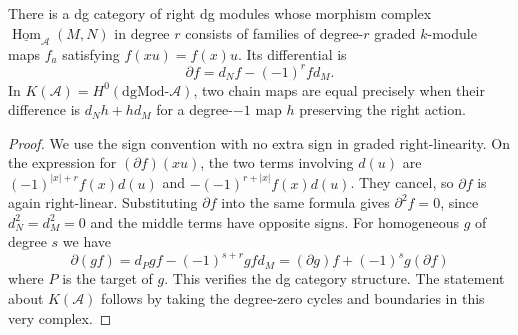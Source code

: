 \begin{proposition}\label{res:G03}
There is a dg category of right dg modules whose morphism complex
\(\underline{\operatorname{Hom}}_{\mathcal A}(M,N)\) in degree \(r\)
consists of families of degree-\(r\) graded \(k\)-module maps
\(f_a\) satisfying \(f(xu)=f(x)u\). Its differential is
\[
        \partial f=d_N f-(-1)^r f d_M .
\]
In \(K(\mathcal A)=H^0(\mathrm{dgMod}\text{-}\mathcal A)\), two chain
maps are equal precisely when their difference is \(d_Nh+hd_M\)
for a degree-\(-1\) map \(h\) preserving the right action.
\end{proposition}
\begin{proof}
We use the sign convention with no extra sign in graded
right-linearity. On the expression for \((\partial f)(xu)\),
the two terms involving \(d(u)\) are
\((-1)^{|x|+r}f(x)d(u)\) and
\(-(-1)^{r+|x|}f(x)d(u)\). They cancel, so \(\partial f\) is
again right-linear. Substituting \(\partial f\) into the same
formula gives \(\partial^2f=0\), since \(d_N^2=d_M^2=0\) and
the middle terms have opposite signs. For homogeneous \(g\)
of degree \(s\) we have
\[
 \partial(gf)
 =d_Pgf-(-1)^{s+r}gfd_M
 =(\partial g)f+(-1)^s g(\partial f)
\]
where \(P\) is the target of \(g\). This verifies the dg category
structure. The statement about \(K(\mathcal A)\) follows by taking
the degree-zero cycles and boundaries in this very complex.
\end{proof}

